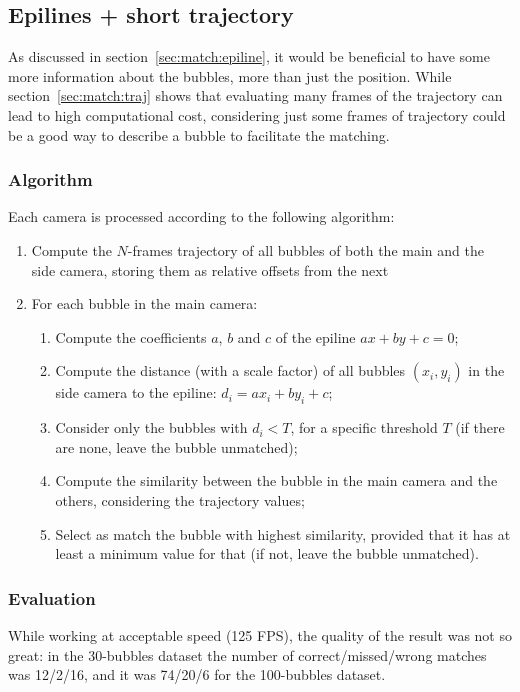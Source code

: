 \subsection{Epilines + short trajectory}
\label{sec:match:epi-traj}

As discussed in section~\ref{sec:match:epiline}, it would be beneficial to have some more information about the bubbles, more than just the position.
While section~\ref{sec:match:traj} shows that evaluating many frames of the trajectory can lead to high computational cost, considering just some frames of trajectory could be a good way to describe a bubble to facilitate the matching.

\subsubsection{Algorithm}

Each camera is processed according to the following algorithm:
\begin{enumerate}
	\itemsep 0em
	\item Compute the $N$-frames trajectory of all bubbles of both the main and the side camera, storing them as relative offsets from the next
	\item For each bubble in the main camera:
	      \begin{enumerate}
		      \item Compute the coefficients $a$, $b$ and $c$ of the epiline $ax+by+c{=}0$;
		      \item Compute the distance (with a scale factor) of all bubbles $(x_i, y_i)$ in the side camera to the epiline: $d_i = ax_i + by_i + c$;
		      \item Consider only the bubbles with $d_i<T$, for a specific threshold $T$ (if there are none, leave the bubble unmatched);
		      \item Compute the similarity between the bubble in the main camera and the others, considering the trajectory values;
		      \item Select as match the bubble with highest similarity, provided that it has at least a minimum value for that (if not, leave the bubble unmatched).
	      \end{enumerate}
\end{enumerate}

\subsubsection{Evaluation}

While working at acceptable speed (125 FPS), the quality of the result was not so great: in the 30-bubbles dataset the number of correct/missed/wrong matches was 12/2/16, and it was 74/20/6 for the 100-bubbles dataset.
